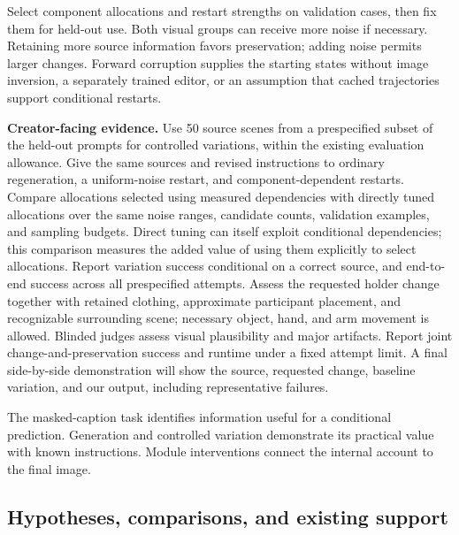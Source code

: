 \documentclass[11pt,letterpaper]{article}
\begin{document}
Select component allocations and restart strengths on validation cases, then fix them for held-out use. Both visual groups can receive more noise if necessary. Retaining more source information favors preservation; adding noise permits larger changes. Forward corruption supplies the starting states without image inversion, a separately trained editor, or an assumption that cached trajectories support conditional restarts.

\textbf{Creator-facing evidence.} Use 50 source scenes from a prespecified subset of the held-out prompts for controlled variations, within the existing evaluation allowance. Give the same sources and revised instructions to ordinary regeneration, a uniform-noise restart, and component-dependent restarts. Compare allocations selected using measured dependencies with directly tuned allocations over the same noise ranges, candidate counts, validation examples, and sampling budgets. Direct tuning can itself exploit conditional dependencies; this comparison measures the added value of using them explicitly to select allocations. Report variation success conditional on a correct source, and end-to-end success across all prespecified attempts. Assess the requested holder change together with retained clothing, approximate participant placement, and recognizable surrounding scene; necessary object, hand, and arm movement is allowed. Blinded judges assess visual plausibility and major artifacts. Report joint change-and-preservation success and runtime under a fixed attempt limit. A final side-by-side demonstration will show the source, requested change, baseline variation, and our output, including representative failures.

The masked-caption task identifies information useful for a conditional prediction. Generation and controlled variation demonstrate its practical value with known instructions. Module interventions connect the internal account to the final image.

\hypertarget{hypotheses-comparisons-and-existing-support}{%
\subsection{Hypotheses, comparisons, and existing support}\label{hypotheses-comparisons-and-existing-support}}
\end{document}
